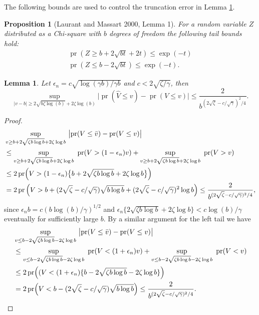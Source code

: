 \documentclass[10pt, reqno]{amsart}
\newtheorem{lemma}{Lemma}[section]
\newtheorem{proposition}{Proposition}[section]
\numberwithin{equation}{section}
\newcommand{\pr}{\mathop{\mathrm{pr}}}
\begin{document}
\begin{appendix}
The following bounds are used to control the truncation error in Lemma \ref{lemmaPart2}.

\begin{proposition}[Laurant and Massart 2000, Lemma 1]\label{prop:massart}
	For a random variable $Z$ distributed as a Chi-square with $b$ degrees of freedom the following tail bounds hold:
	\begin{align*}
		\pr( Z \geq b +2 \sqrt{bt} + 2t ) \leq \exp(-t)\\
		\pr( Z \leq b -2 \sqrt{bt} ) \leq \exp(-t).
	\end{align*}
\end{proposition}


\begin{lemma}\label{lemmaPart2}
	Let $\epsilon_n   = c \sqrt{\log(\gamma b)/\gamma b}$ and $c <  2\sqrt{\zeta/\gamma}$, then
	\[
	\sup_{|v - b| \geq 2\sqrt{b\zeta\log(b)} + 2\zeta\log(b) }\bigl|\pr(\hat V \leq v) - \pr(V \leq v)\bigr| \leq \frac{2}{b^{(2\sqrt{\zeta} - c/\sqrt{\gamma})^2/4}}.
	\]
\end{lemma}
\begin{proof}
	\begin{align*}
		&\sup_{v \geq b + 2\sqrt{\zeta b \log b} + 2\zeta\log b} \ \bigl|\pr(V\leq \bar v) - \pr(V \leq v) \bigr|  \\
		&\leq \sup_{v \geq b + 2\sqrt{\zeta b \log b} + 2\zeta\log b} \ \pr(V > (1 - \epsilon_n) v)  + \sup_{v \geq b + 2\sqrt{\zeta b \log b } + 2\zeta\log b} \ \pr(V > v) \\
		&\leq 2\pr\Bigl(V > (1 - \epsilon_n)\bigl\{b + 2\sqrt{\zeta b\log b} + 2\zeta\log b \bigr\}\Bigr) \\
		&= 2\pr\left(V >  b + (2\sqrt{\zeta} - c/\sqrt{\gamma} )\sqrt{b\log b} + (2\sqrt{\zeta} - c/\sqrt{\gamma})^2\log b\right) \leq \frac{2}{b^{(2\sqrt{\zeta} - c/\sqrt{\gamma})^2/4}},
	\end{align*}
	since $\epsilon_n b   =  c(b\log (b)/\gamma)^{1/2}$  and $\epsilon_n\{2\sqrt{\zeta b\log b} + 2\zeta\log b\}< c\log(b)/\gamma$ eventually for sufficiently large $b$. By a similar argument for the left tail we have
	\begin{align*}
		&\sup_{v \leq b - 2\sqrt{\zeta b\log b } - 2\zeta\log b} \ \bigl|\pr(V\leq \bar v) - \pr(V \leq v) \bigr|  \\
		&\leq \sup_{v \leq b - 2\sqrt{\zeta b \log b } - 2\zeta\log b} \ \pr(V < (1 + \epsilon_n) v)  + \sup_{v \leq b - 2\sqrt{\zeta b\log b}- 2\zeta\log b} \ \pr(V < v) \\
		&\leq 2\pr\Bigl((V < (1 + \epsilon_n)\{b - 2\sqrt{\zeta b \log b} - 2\zeta\log b \}\Bigr) \\
		&= 2\pr\Bigl(V <  b - (2\sqrt{\zeta} - c/\sqrt{\gamma})\sqrt{b\log b}\Bigr) \leq \frac{2}{b^{(2\sqrt{\zeta} - c/\sqrt{\gamma})^2/4}}.
	\end{align*}
\end{proof}



\end{appendix}
\end{document}
